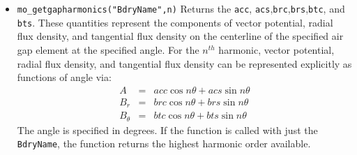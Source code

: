 \begin{itemize}
\item{\verb+mo_getgapharmonics("BdryName",n)+}
Returns the {\tt acc}, {\tt acs},{\tt brc},{\tt  brs},{\tt  btc}, and {\tt bts}.  These quantities represent the
components of vector potential, radial flux density, and tangential flux density on the centerline of the specified air gap element at the specified angle.  
For the $n^{th}$ harmonic, vector potential, radial flux density, and tangential flux density can be represented explicitly as functions of angle via:
\begin{eqnarray}
A    & = & acc \cos{n \theta} + acs \sin{n \theta} \nonumber  \\ 
B_r & = & brc \cos{n \theta}+ brs \sin{n \theta}   \nonumber \\
B_\theta & = & btc \cos{n \theta} + bts \sin{n \theta}  \nonumber
\end{eqnarray}
 The angle is  specified in degrees.  If the function is called with just the {\tt BdryName}, the function returns the highest harmonic order available.

\end{itemize}


